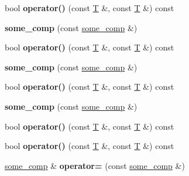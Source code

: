 \begin{DoxyCompactItemize}
\item 
\mbox{\label{structsome__comp_a6a7124af43ee189c025dee7d7482eaba}} 
bool {\bfseries operator()} (const \mbox{\hyperlink{struct_t}{T}} \&, const \mbox{\hyperlink{struct_t}{T}} \&) const
\item 
\mbox{\label{structsome__comp_acb6b551db492c34e1354464e12b57857}} 
{\bfseries some\+\_\+comp} (const \mbox{\hyperlink{structsome__comp}{some\+\_\+comp}} \&)
\item 
\mbox{\label{structsome__comp_a6a7124af43ee189c025dee7d7482eaba}} 
bool {\bfseries operator()} (const \mbox{\hyperlink{struct_t}{T}} \&, const \mbox{\hyperlink{struct_t}{T}} \&) const
\item 
\mbox{\label{structsome__comp_acb6b551db492c34e1354464e12b57857}} 
{\bfseries some\+\_\+comp} (const \mbox{\hyperlink{structsome__comp}{some\+\_\+comp}} \&)
\item 
\mbox{\label{structsome__comp_a6a7124af43ee189c025dee7d7482eaba}} 
bool {\bfseries operator()} (const \mbox{\hyperlink{struct_t}{T}} \&, const \mbox{\hyperlink{struct_t}{T}} \&) const
\item 
\mbox{\label{structsome__comp_acb6b551db492c34e1354464e12b57857}} 
{\bfseries some\+\_\+comp} (const \mbox{\hyperlink{structsome__comp}{some\+\_\+comp}} \&)
\item 
\mbox{\label{structsome__comp_a6a7124af43ee189c025dee7d7482eaba}} 
bool {\bfseries operator()} (const \mbox{\hyperlink{struct_t}{T}} \&, const \mbox{\hyperlink{struct_t}{T}} \&) const
\item 
\mbox{\label{structsome__comp_a6a7124af43ee189c025dee7d7482eaba}} 
bool {\bfseries operator()} (const \mbox{\hyperlink{struct_t}{T}} \&, const \mbox{\hyperlink{struct_t}{T}} \&) const
\item 
\mbox{\label{structsome__comp_a3cf31772d92b1481d71121d650f28a01}} 
\mbox{\hyperlink{structsome__comp}{some\+\_\+comp}} \& {\bfseries operator=} (const \mbox{\hyperlink{structsome__comp}{some\+\_\+comp}} \&)
\item 

\end{DoxyCompactItemize}
